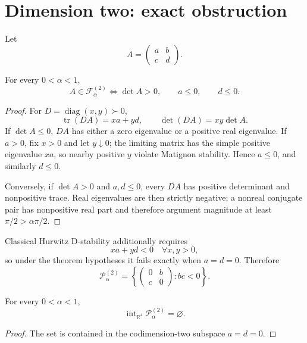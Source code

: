 \section{Dimension two: exact obstruction}
\label{sec:dimension-two}

Let
\[
A=\begin{pmatrix}a&b\\c&d\end{pmatrix}.
\]

\begin{theorem}
\label{thm:2x2}
For every \(0<\alpha<1\),
\[
A\in\mathcal F_\alpha^{(2)}
\iff
\det A>0,\qquad a\le0,\qquad d\le0.
\]
\end{theorem}

\begin{proof}
For \(D=\operatorname{diag}(x,y)\succ0\),
\[
\operatorname{tr}(DA)=xa+yd,
\qquad
\det(DA)=xy\det A.
\]
If \(\det A\le0\), \(DA\) has either a zero eigenvalue or a positive real eigenvalue. If \(a>0\), fix \(x>0\) and let \(y\downarrow0\); the limiting matrix has the simple positive eigenvalue \(xa\), so nearby positive \(y\) violate Matignon stability. Hence \(a\le0\), and similarly \(d\le0\).

Conversely, if \(\det A>0\) and \(a,d\le0\), every \(DA\) has positive determinant and nonpositive trace. Real eigenvalues are then strictly negative; a nonreal conjugate pair has nonpositive real part and therefore argument magnitude at least \(\pi/2>\alpha\pi/2\).
\end{proof}

Classical Hurwitz D-stability additionally requires
\[
xa+yd<0
\quad\forall x,y>0,
\]
so under the theorem hypotheses it fails exactly when \(a=d=0\). Therefore
\[
\mathcal P_\alpha^{(2)}
=
\left\{
\begin{pmatrix}0&b\\c&0\end{pmatrix}:bc<0
\right\}.
\]

\begin{corollary}
\label{cor:2x2-empty-interior}
For every \(0<\alpha<1\),
\[
\operatorname{int}_{\mathbb R^4}\mathcal P_\alpha^{(2)}=\varnothing.
\]
\end{corollary}

\begin{proof}
The set is contained in the codimension-two subspace \(a=d=0\).
\end{proof}
